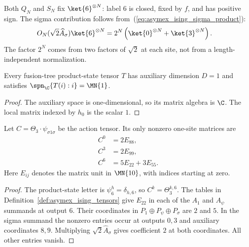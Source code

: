 Both $Q_N$ and $S_N$ fix $\ket{6}^{\otimes N}$: label $6$ is closed,
fixed by $f$, and has positive sign. The sigma contribution follows
from~(\ref{eq:asymex_ising_sigma_product}):
\begin{align}
    O_N(\sqrt2\widehat A_\sigma)\ket{6}^{\otimes N}
     & =2^N\left(\ket{0}^{\otimes N}+\ket{3}^{\otimes N}\right).
\end{align}
The factor $2^N$ comes from two factors of $\sqrt2$ at each site,
not from a length-independent normalization.

\begin{lemma}%
    \label{thm:asymex_ising_action_normal}
    \leanok
    Every fusion-tree product-state tensor $T$ has auxiliary dimension
    $D=1$ and satisfies $\spn_{\C}\{T(i) : i\} = \MN{1}$.
\end{lemma}

\begin{proof}
    \leanok
    The auxiliary space is one-dimensional, so its matrix algebra is
    $\C$. The local matrix indexed by $h_0$ is the scalar $1$.
\end{proof}

\begin{lemma}%
    \label{thm:asymex_ising_action_diagonal}
    \leanok
    Let $C=\Theta_3\cdot\psi_{\sigma1\sigma}$ be the action tensor.
    Its only nonzero one-site matrices are
    \begin{align}
        C^0 & =2E_{88},         \\
        C^3 & =2E_{99},         \\
        C^6 & =5E_{22}+3E_{55}.
        \label{eq:asymex_ising_action_six}
    \end{align}
    Here $E_{ij}$ denotes the matrix unit in $\MN{10}$, with
    indices starting at zero.
\end{lemma}

\begin{proof}
    \leanok
    The product-state letter is $\psi_6^h=\delta_{h,6}$, so
    $C^k=\Theta_3^{k,6}$. The tables in
    Definition~\ref{def:asymex_ising_tensors} give $E_{22}$ in each
    of the $A_1$ and $A_\psi$ summands at output $6$.
    Their coordinates in $P_1\oplus P_\psi\oplus P_\sigma$ are $2$ and $5$.
    In the sigma summand the nonzero entries occur at outputs $0,3$
    and auxiliary coordinates $8,9$. Multiplying
    $\sqrt2\widehat A_\sigma$ gives coefficient $2$ at both coordinates.
    All other entries vanish.
\end{proof}

